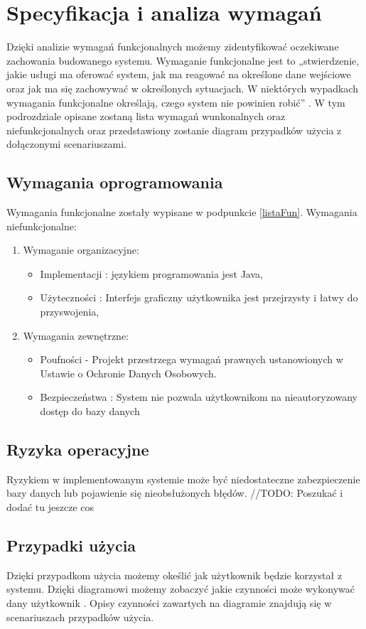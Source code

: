 \section{Specyfikacja i analiza wymagań}
Dzięki analizie wymagań funkcjonalnych możemy zidentyfikować oczekiwane zachowania budowanego systemu. Wymaganie funkcjonalne jest to „stwierdzenie, jakie usługi ma oferować system, jak ma reagować na określone dane wejściowe oraz jak ma się zachowywać w określonych sytuacjach. W niektórych wypadkach wymagania funkcjonalne określają, czego system nie powinien robić” \cite{DOC02}. W tym podrozdziale opisane zostaną lista wymagań wunkonalnych oraz niefunkcjonalnych oraz przedstawiony zostanie diagram przypadków użycia z dołączonymi scenariuszami.
\subsection{Wymagania oprogramowania}
Wymagania funkcjonalne zostały wypisane w podpunkcie \ref{listaFun}.
Wymagania niefunkcjonalne:
\begin{enumerate}
	\item Wymaganie organizacyjne:
		\begin{itemize}
			\item Implementacji : językiem programowania jest Java,
			\item Użyteczności : Interfejs graficzny użytkownika jest przejrzysty i łatwy do przyswojenia,
		\end{itemize}
	\item Wymagania zewnętrzne:		
		\begin{itemize}
			\item Poufności - Projekt przestrzega wymagań prawnych ustanowionych w Ustawie o Ochronie Danych Osobowych.
			\item Bezpieczeństwa : System nie pozwala użytkownikom na nieautoryzowany dostęp do bazy danych
		\end{itemize}
\end{enumerate}
\subsection{Ryzyka operacyjne}
Ryzykiem w implementowanym systemie może być niedostateczne zabezpieczenie bazy danych lub pojawienie się nieobsłużonych błędów.
//TODO: Poszukać i dodać tu jeszcze cos
\subsection{Przypadki użycia}
Dzięki przypadkom użycia możemy okeślić jak użytkownik będzie korzystał z systemu. Dzięki diagramowi możemy zobaczyć jakie czynności może wykonywać dany użytkownik \cite{DOC03}. Opisy czynności zawartych na diagramie znajdują się w scenariuszach przypadków użycia.

